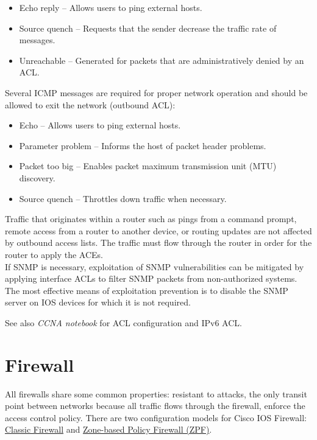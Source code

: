 \begin{itemize}
\item Echo reply -- Allows users to ping external hosts.
\item Source quench -- Requests that the sender decrease the traffic rate of messages.
\item Unreachable -- Generated for packets that are administratively denied by an ACL.
\end{itemize}

Several ICMP messages are required for proper network operation and should be allowed to exit the network (outbound ACL):

\begin{itemize}
\item Echo -- Allows users to ping external hosts.
\item Parameter problem -- Informs the host of packet header problems.
\item Packet too big -- Enables packet maximum transmission unit (MTU) discovery.
\item Source quench -- Throttles down traffic when necessary.
\end{itemize}

Traffic that originates within a router such as pings from a command prompt, remote access from a router to another device, or routing updates are not affected by outbound access lists. The traffic must flow through the router in order for the router to apply the ACEs.\\


If SNMP is necessary, exploitation of SNMP vulnerabilities can be mitigated by applying interface ACLs to filter SNMP packets from non-authorized systems.  The most effective means of exploitation prevention is to disable the SNMP server on IOS devices for which it is not required. 

\note See also \emph{CCNA notebook} for ACL configuration and IPv6 ACL.

\section{Firewall}

All firewalls share some common properties: resistant to attacks, the only transit point between networks because all traffic flows through the firewall, enforce the access control policy. There are two configuration models for Cisco IOS Firewall: \hyperref[sec:ClassicFirewall]{Classic Firewall} and \hyperref[sec:ZPF]{Zone-based Policy Firewall (ZPF)}.\\


